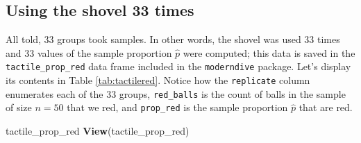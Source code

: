 \documentclass[12pt,]{krantz}
\makeatletter
\newenvironment{Shaded}{\begin{snugshade}}{\end{snugshade}}
\newcommand{\KeywordTok}[1]{\textcolor[rgb]{0.27,0.27,0.27}{\textbf{#1}}}
\newcommand{\NormalTok}[1]{#1}
\newenvironment{kframe}{%
\medskip{}
\setlength{\fboxsep}{.8em}
 \def\at@end@of@kframe{}%
 \ifinner\ifhmode%
  \def\at@end@of@kframe{\end{minipage}}%
  \begin{minipage}{\columnwidth}%
 \fi\fi%
 \def\FrameCommand##1{\hskip\@totalleftmargin \hskip-\fboxsep
 \colorbox{shadecolor}{##1}\hskip-\fboxsep
     \hskip-\linewidth \hskip-\@totalleftmargin \hskip\columnwidth}%
 \MakeFramed {\advance\hsize-\width
   \@totalleftmargin\z@ \linewidth\hsize
   \@setminipage}}%
 {\par\unskip\endMakeFramed%
 \at@end@of@kframe}
\renewenvironment{Shaded}{\begin{kframe}}{\end{kframe}}
\theoremstyle{definition}
\theoremstyle{definition}
\theoremstyle{definition}
\theoremstyle{remark}
\makeatother
\begin{document}
\subsection{Using the shovel 33 times}\label{student-shovels}

All told, 33 groups took samples. In other words, the shovel was used 33
times and 33 values of the sample proportion \(\widehat{p}\) were
computed; this data is saved in the \texttt{tactile\_prop\_red} data
frame included in the \texttt{moderndive} package. Let's display its
contents in Table \ref{tab:tactilered}. Notice how the
\texttt{replicate} column enumerates each of the 33 groups,
\texttt{red\_balls} is the count of balls in the sample of size \(n=50\)
that we red, and \texttt{prop\_red} is the sample proportion
\(\widehat{p}\) that are red.

\begin{Shaded}
\begin{Highlighting}[]
\NormalTok{tactile_prop_red}
\KeywordTok{View}\NormalTok{(tactile_prop_red)}
\end{Highlighting}
\end{Shaded}

\begingroup\fontsize{10}{12}\selectfont
\end{document}
